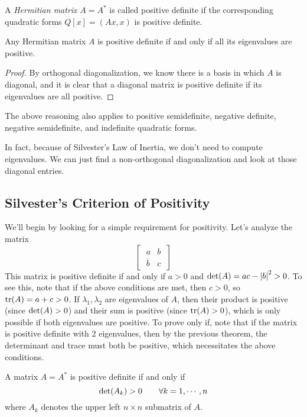 A \textit{Hermitian matrix} $A = A^{*}$ is called positive definite if the corresponding quadratic forms $Q[x] = (Ax, x)$ is positive definite. 

\begin{theorem}
Any Hermitian matrix $A$ is positive definite if and only if all its eigenvalues are positive.
\end{theorem}

\begin{proof}
By orthogonal diagonalization, we know there is a basis in which $A$ is diagonal, and it is clear that a diagonal matrix is positive definite if its eigenvalues are all positive. 
\end{proof}

The above reasoning also applies to positive semidefinite, negative definite, negative semidefinite, and indefinite quadratic forms. 

In fact, because of Silvester's Law of Inertia, we don't need to compute eigenvalues. We can just find a non-orthogonal diagonalization and look at those diagonal entries. 

\subsection{Silvester's Criterion of Positivity}

We'll begin by looking for a simple requirement for positivity. Let's analyze the matrix 
$$\begin{bmatrix}
\; a & b \; \\
\; \overline{b} & c \;
\end{bmatrix}$$
This matrix is positive definite if and only if $a > 0$ and $\operatorname{det}(A)= ac - \abs{b}^{2} > 0$. To see this, note that if the above conditions are met, then $c > 0$, so $\operatorname{tr}(A) = a + c > 0$. If $\lambda_{1}, \lambda_{2}$ are eigenvalues of $A$, then their product is positive (since $\operatorname{det}(A) > 0$) and their sum is positive (since $\operatorname{tr}(A) > 0$), which is only possible if both eigenvalues are positive. To prove only if, note that if the matrix is positive definite with 2 eigenvalues, then by the previous theorem, the determinant and trace must both be positive, which necessitates the above conditions. 

\begin{theorem} 
A matrix $A = A^{*}$ is positive definite if and only if 
$$\operatorname{det}(A_{k}) > 0 \qquad \forall k = 1, \cdots, n$$
where $A_{k}$ denotes the upper left $n \times n$ submatrix of $A$. 
\end{theorem}

